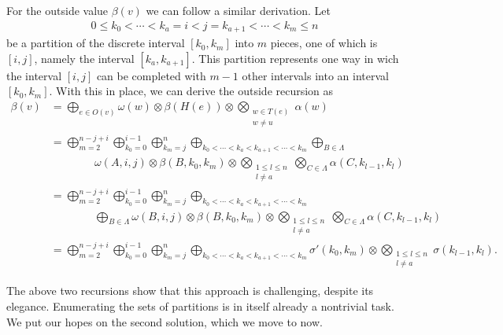     For the outside value $\beta(v)$ we can follow a similar derivation. Let
    \begin{align*}
      0 \leq k_0 < \cdots < k_a = i < j = k_{a+1} < \cdots < k_m \leq n
    \end{align*}
    be a partition of the discrete interval $[k_0, k_m]$ into $m$ pieces, one of which is $[i, j]$, namely the interval $[k_a, k_{a+1}]$. This partition represents one way in wich the interval $[i, j]$ can be completed with $m-1$ other intervals into an interval $[k_0, k_m]$. With this in place, we can derive the outside recursion as
    \begin{align*}
      \beta(v)
        &= \displaystyle\bigoplus_{e \in O(v)} \omega(w) \otimes \beta(H(e)) \otimes \displaystyle\bigotimes_{ \substack{ w \in T(e) \\ w \neq u } } \alpha(w) \\
        &= \displaystyle\bigoplus_{m = 2}^{n - j + i} \displaystyle\bigoplus_{k_0=0}^{i-1} \displaystyle\bigoplus_{k_m = j}^{n} \displaystyle\bigoplus_{k_0 < \cdots < k_a < k_{a+1} < \cdots < k_m} \displaystyle\bigoplus_{B \in \Lambda}  \\
          &\qquad\qquad \omega(A, i, j) \otimes \beta(B, k_0, k_m) \otimes \displaystyle\bigotimes_{ \substack{1 \leq l \leq n \\ l \neq a } } \displaystyle\bigotimes_{C \in \Lambda} \alpha(C, k_{l-1}, k_l) \\
        &= \displaystyle\bigoplus_{m = 2}^{n - j + i} \displaystyle\bigoplus_{k_0=0}^{i-1} \displaystyle\bigoplus_{k_m = j}^{n} \displaystyle\bigoplus_{k_0 < \cdots < k_a < k_{a+1} < \cdots < k_m}  \\
          &\qquad\qquad \displaystyle\bigoplus_{B \in \Lambda} \omega(B, i, j) \otimes \beta(B, k_0, k_m) \otimes \displaystyle\bigotimes_{ \substack{1 \leq l \leq n \\ l \neq a } } \displaystyle\bigotimes_{C \in \Lambda} \alpha(C, k_{l-1}, k_l)  \\
        &= \displaystyle\bigoplus_{m = 2}^{n - j + i} \displaystyle\bigoplus_{k_0=0}^{i-1} \displaystyle\bigoplus_{k_m = j}^{n} \displaystyle\bigoplus_{k_0 < \cdots < k_a < k_{a+1} < \cdots < k_m} \sigma'(k_0, k_m) \otimes \displaystyle\bigotimes_{ \substack{1 \leq l \leq n \\ l \neq a } } \sigma(k_{l-1}, k_l).
    \end{align*}

    The above two recursions show that this approach is challenging, despite its elegance. Enumerating the sets of partitions is in itself already a nontrivial task. We put our hopes on the second solution, which we move to now.

